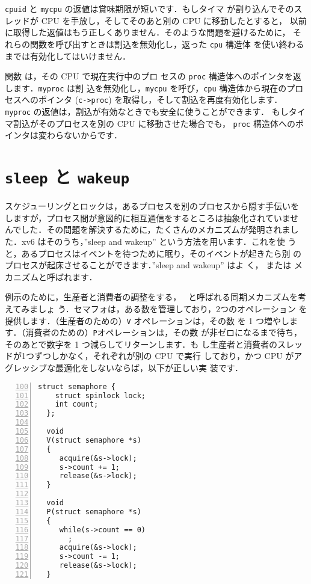 \lstinline{cpuid} と \lstinline{mycpu} の返値は賞味期限が短いです．もしタイマ
が割り込んでそのスレッドが CPU を手放し，そしてそのあと別の CPU に移動したとすると，
以前に取得した返値はもう正しくありません．そのような問題を避けるために，
それらの関数を呼び出すときは割込を無効化し，返った \lstinline{cpu} 構造体
を使い終わるまでは有効化してはいけません．

 関数  は，その CPU で現在実行中のプロ
セスの \lstinline{proc} 構造体へのポインタを返します．\lstinline{myproc} は割
込を無効化し，\lstinline{mycpu} を呼び，\lstinline{cpu} 構造体から現在のプロ
セスへのポインタ (\lstinline{c->proc}) を取得し，そして割込を再度有効化します．
\lstinline{myproc} の返値は，割込が有効なときでも安全に使うことができます．
もしタイマ割込がそのプロセスを別の CPU に移動させた場合でも，
\lstinline{proc} 構造体へのポインタは変わらないからです．

\section{\texttt{sleep} と \texttt{wakeup}}
\label{sec:sleep}

スケジューリングとロックは，あるプロセスを別のプロセスから隠す手伝いを
しますが，プロセス間が意図的に相互通信をするところは抽象化されていませ
んでした．その問題を解決するために，たくさんのメカニズムが発明されまし
た．xv6 はそのうち，''sleep and wakeup'' という方法を用います．これを使
うと，あるプロセスはイベントを待つために眠り，そのイベントが起きたら別
のプロセスが起床させることができます．''sleep and wakeup'' はよ
く， または 
メカニズムと呼ばれます．

例示のために，生産者と消費者の調整をする，~\cite{dijkstra65} と呼ばれる同期メカニズムを考えてみましょ
う．セマフォは，ある数を管理しており，2つのオペレーション
を提供します．（生産者のための）\texttt{V} オペレーションは，その数
を 1 つ増やします．（消費者のための）\texttt{P}オペレーションは，その数
が非ゼロになるまで待ち，そのあとで数字を 1 つ減らしてリターンします．も
し生産者と消費者のスレッドが1つずつしかなく，それぞれが別の CPU で実行
しており，かつ CPU がアグレッシブな最適化をしないならば，以下が正しい実
装です．
\begin{lstlisting}[numbers=left,firstnumber=100]
  struct semaphore {
    struct spinlock lock;
    int count;
  };

  void
  V(struct semaphore *s)
  {
     acquire(&s->lock);
     s->count += 1;
     release(&s->lock);
  }

  void
  P(struct semaphore *s)
  {
     while(s->count == 0)
       ;
     acquire(&s->lock);
     s->count -= 1;
     release(&s->lock);
  }
\end{lstlisting}

